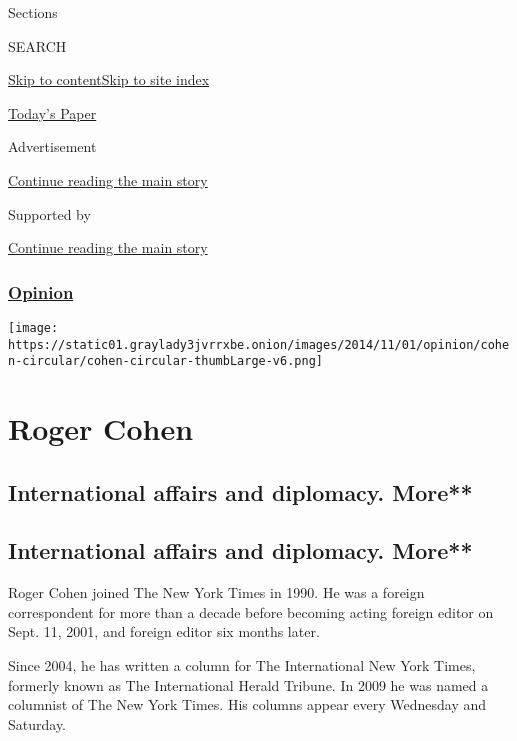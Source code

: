 Sections

SEARCH

\protect\hyperlink{site-content}{Skip to
content}\protect\hyperlink{site-index}{Skip to site index}

\href{https://myaccount.nytimes3xbfgragh.onion/auth/login?response_type=cookie\&client_id=vi}{}

\href{https://www.nytimes3xbfgragh.onion/section/todayspaper}{Today's
Paper}

Advertisement

\protect\hyperlink{after-top}{Continue reading the main story}

Supported by

\protect\hyperlink{after-sponsor}{Continue reading the main story}

\hypertarget{opinion}{%
\subsubsection{\texorpdfstring{\href{/section/opinion}{Opinion}}{Opinion}}\label{opinion}}

\texttt{[image: https://static01.graylady3jvrrxbe.onion/images/2014/11/01/opinion/cohen-circular/cohen-circular-thumbLarge-v6.png]}

\hypertarget{roger-cohen}{%
\section{Roger Cohen}\label{roger-cohen}}

\hypertarget{international-affairs-and-diplomacy-more}{%
\subsection{International affairs and diplomacy.
More**}\label{international-affairs-and-diplomacy-more}}

\hypertarget{international-affairs-and-diplomacy-more-1}{%
\subsection{International affairs and diplomacy.
More**}\label{international-affairs-and-diplomacy-more-1}}

Roger Cohen joined The New York Times in 1990. He was a foreign
correspondent for more than a decade before becoming acting foreign
editor on Sept. 11, 2001, and foreign editor six months later.

Since 2004, he has written a column for The International New York
Times, formerly known as The International Herald Tribune. In 2009 he
was named a columnist of The New York Times. His columns appear every
Wednesday and Saturday.

